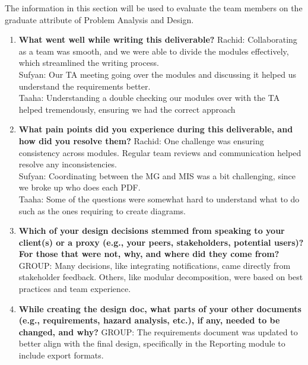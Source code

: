 \documentclass[12pt, titlepage]{article}
\begin{document}
The information in this section will be used to evaluate the team members on the
graduate attribute of Problem Analysis and Design.



\begin{enumerate}
  \item \textbf{What went well while writing this deliverable?}  
  \newline
  Rachid: Collaborating as a team was smooth, and we were able to divide the modules effectively, which streamlined the writing process. \\
  Sufyan: Our TA meeting going over the modules and discussing it helped us understand the requirements better. \\
  Taaha: Understanding a double checking our modules over with the TA helped tremendously, ensuring we had the correct approach \\

  \item \textbf{What pain points did you experience during this deliverable, and how did you resolve them?}  
  \newline
  Rachid: One challenge was ensuring consistency across modules. Regular team reviews and communication helped resolve any inconsistencies. \\
  Sufyan: Coordinating between the MG and MIS was a bit challenging, since we broke up who does each PDF. \\
  Taaha: Some of the questions were somewhat hard to understand what to do such as the ones requiring to create diagrams. \\

  \item \textbf{Which of your design decisions stemmed from speaking to your client(s) or a proxy (e.g., your peers, stakeholders, potential users)? For those that were not, why, and where did they come from?}  
  \newline
  GROUP: Many decisions, like integrating notifications, came directly from stakeholder feedback. Others, like modular decomposition, were based on best practices and team experience.

  \item \textbf{While creating the design doc, what parts of your other documents (e.g., requirements, hazard analysis, etc.), if any, needed to be changed, and why?}  
  \newline
  GROUP: The requirements document was updated to better align with the final design, specifically in the Reporting module to include export formats.


\end{enumerate}
\end{document}
